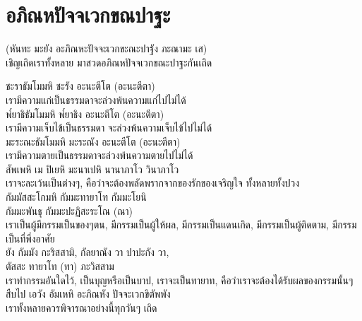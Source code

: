\documentclass{article}
\begin{document}
\pagebreak
\section{อภิณหปัจจเวกขณปาฐะ}
\begin{center}
(หันทะ มะยัง อะภิณหะปัจจะเวกขะณะปาฐัง ภะณามะ เส)\\
เชิญเถิดเราทั้งหลาย มาสวดอภิณหปัจจเวกขณะปาฐะกันเถิด
\end{center}
ชะราธัมโมมหิ ชะรัง อะนะตีโต (อะนะตีตา) \\
\indent เรามีความแก่เป็นธรรมดาจะล่วงพ้นความแก่ไปไม่ได้\\
พ๎ยาธิธัมโมมหิ พ๎ยาธิง อะนะตีโต (อะนะตีตา)  \\
\indent เรามีความเจ็บไข้เป็นธรรมดา จะล่วงพ้นความเจ็บไข้ไปไม่ได้\\
มะระณะธัมโมมหิ มะระณัง อะนะตีโต (อะนะตีตา) \\
\indent เรามีความตายเป็นธรรมดาจะล่วงพ้นความตายไปไม่ได้\\
สัพเพหิ เม ปิเยหิ มะนาเปหิ นานาภาโว วินาภาโว\\
\indent เราจะละเว้นเป็นต่างๆ, คือว่าจะต้องพลัดพรากจากของรักของเจริญใจ ทั้งหลายทั้งปวง\\
กัมมัสสะโกมหิ กัมมะทายาโท กัมมะโยนิ\\
กัมมะพันธุ กัมมะปะฏิสะระโณ (ณา)  \\
\indent เราเป็นผู้มีกรรมเป็นของๆตน, มีกรรมเป็นผู้ให้ผล,
มีกรรมเป็นแดนเกิด, มีกรรมเป็นผู้ติดตาม, มีกรรมเป็นที่พึ่งอาศัย\\
ยัง กัมมัง กะริสสามิ, กัลยาณัง วา ปาปะกัง วา,\\
ตัสสะ ทายาโท (ทา)  ภะวิสสาม\\
\indent เราทำกรรมอันใดไว้, เป็นบุญหรือเป็นบาป,
เราจะเป็นทายาท, คือว่าเราจะต้องได้รับผลของกรรมนั้นๆ สืบไป
เอวัง อัมเหหิ อะภิณหัง ปัจจะเวกขิตัพพัง\\
\indent เราทั้งหลายควรพิจารณาอย่างนี้ทุกวันๆ เถิด

\pagebreak
\end{document}
